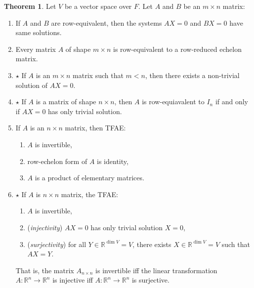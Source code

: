 \documentclass[letterpaper,11pt,twoside]{article}
\theoremstyle{definition}
\theoremstyle{definition}
\newtheorem{theorem}[proposition]{Theorem}
\theoremstyle{definition}
\theoremstyle{definition}
\theoremstyle{definition}
\theoremstyle{definition}
\theoremstyle{remark}
\theoremstyle{definition}
\newcommand{\R}[0]{\mathbb{R}}
\begin{document}
    \begin{theorem}
        Let $V$ be a vector space over $F$. Let $A$ and $B$ be an $m\times n$ matrix:
        \begin{enumerate}
            \item {If $A$ and $B$ are row-equivalent, then the systems $AX= 0$ and $BX = 0$ have same solutions.}
            \item {Every matrix $A$ of shape $m\times n$ is row-equivalent to a row-reduced echelon matrix.}
            \item {$\star$ If $A$ is an $m\times n$ matrix such that $m< n$, then there exists a non-trivial solution of $AX = 0$.}
            \item {$\star$ If $A$ is a matrix of shape $n\times n$, then $A$ is row-equiavalent to $I_n$ if and only if $AX = 0$ has only trivial solution.}
            \item {If $A$ is an $n\times n$ matrix, then TFAE:
                \begin{enumerate}
                    \item {$A$ is invertible,}
                    \item {row-echelon form of $A$ is identity,}
                    \item {$A$ is a product of elementary matrices.}
                \end{enumerate}
            }
            \item {$\star$ If $A$ is $n\times n$ matrix, the TFAE:
            \begin{enumerate}
                \item {$A$ is invertible,}
                \item {(\textit{injectivity}) $AX = 0$ has only trivial solution $X= 0$,}
                \item {(\textit{surjectivity}) for all $Y \in \R^{\dim V} = V$, there exists $X \in \R^{\dim V} = V$ such that $AX = Y$.}
            \end{enumerate}
            That is, the matrix $A_{n\times n}$ is invertible iff the linear transformation $A : \R^n \to \R^n$ is injective iff $A : \R^n \to \R^n$ is surjective.}
        \end{enumerate}
    \end{theorem}
\end{document}
